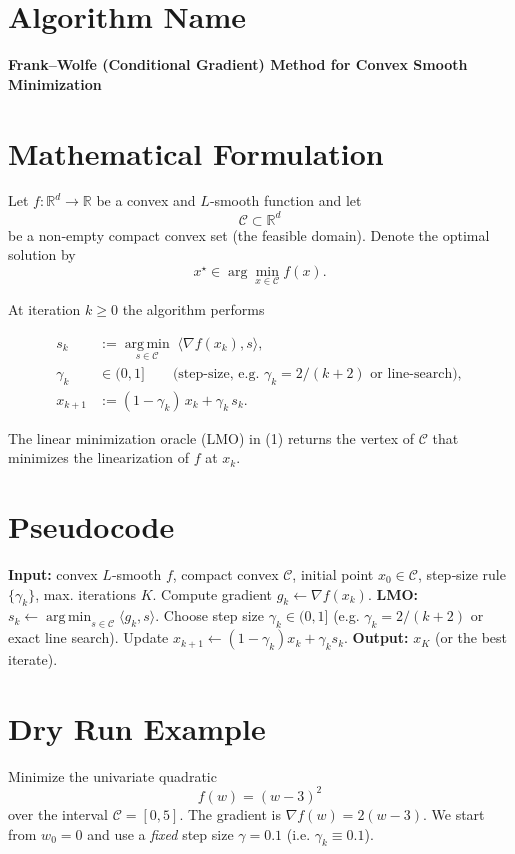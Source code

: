 \documentclass{article}
\newcommand{\argmin}{\operatorname*{arg\,min}}
\newcommand{\ip}[2]{\langle #1,#2\rangle}
\newcommand{\R}{\mathbb{R}}
\begin{document}
\section*{Algorithm Name}
\textbf{Frank–Wolfe (Conditional Gradient) Method for Convex Smooth Minimization}

\section*{Mathematical Formulation}
Let $f:\R^{d}\rightarrow\R$ be a convex and $L$‑smooth function and let 
\[
\mathcal{C}\subset\R^{d}
\]
be a non‑empty compact convex set (the feasible domain).  
Denote the optimal solution by 
\[
x^{\star}\in\arg\min_{x\in\mathcal{C}}f(x).
\]

At iteration $k\ge 0$ the algorithm performs

\begin{align}
s_{k} &:= \argmin_{s\in\mathcal{C}} \;\ip{\nabla f(x_{k})}{s}, \tag{1}\\[4pt]
\gamma_{k} &\in (0,1] \qquad\text{(step‑size, e.g. $\gamma_{k}=2/(k+2)$ or line‑search)},\\[4pt]
x_{k+1} &:= (1-\gamma_{k})\,x_{k} + \gamma_{k}\,s_{k}. \tag{2}
\end{align}

The linear minimization oracle (LMO) in (1) returns the vertex of $\mathcal{C}$
that minimizes the linearization of $f$ at $x_{k}$.

\section*{Pseudocode}
\begin{algorithm}[H]
\caption{Frank–Wolfe}
\begin{algorithmic}[1]
\State \textbf{Input:} convex $L$‑smooth $f$, compact convex $\mathcal{C}$, 
initial point $x_{0}\in\mathcal{C}$, step‑size rule $\{\gamma_{k}\}$, 
max. iterations $K$.
    \State Compute gradient $g_{k}\gets\nabla f(x_{k})$.
    \State \textbf{LMO:} $s_{k}\gets\argmin_{s\in\mathcal{C}}\ip{g_{k}}{s}$.
    \State Choose step size $\gamma_{k}\in(0,1]$ 
          (e.g. $\gamma_{k}=2/(k+2)$ or exact line search).
    \State Update $x_{k+1}\gets (1-\gamma_{k})x_{k}+\gamma_{k}s_{k}$.
\EndFor
\State \textbf{Output:} $x_{K}$ (or the best iterate).
\end{algorithmic}
\end{algorithm}

\section*{Dry Run Example}
Minimize the univariate quadratic 
\[
f(w)=(w-3)^{2}
\]
over the interval $\mathcal{C}=[0,5]$.  
The gradient is $\nabla f(w)=2(w-3)$.  
We start from $w_{0}=0$ and use a \emph{fixed} step size
$\gamma=0.1$ (i.e. $\gamma_{k}\equiv0.1$).
\end{document}
